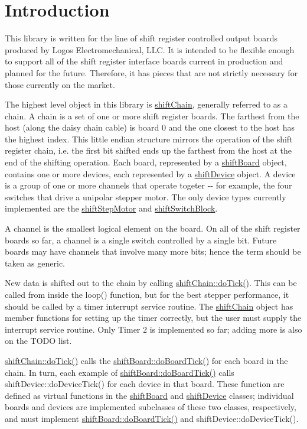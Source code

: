 \hypertarget{main_intro}{}\section{Introduction}\label{main_intro}
This library is written for the line of shift register controlled output boards produced by Logos Electromechanical, LLC. It is intended to be flexible enough to support all of the shift register interface boards current in production and planned for the future. Therefore, it has pieces that are not strictly necessary for those currently on the market.

The highest level object in this library is \hyperlink{classshift_chain}{shiftChain}, generally referred to as a chain. A chain is a set of one or more shift register boards. The farthest from the host (along the daisy chain cable) is board 0 and the one closest to the host has the highest index. This little endian structure mirrors the operation of the shift register chain, i.e. the first bit shifted ends up the farthest from the host at the end of the shifting operation. Each board, represented by a \hyperlink{classshift_board}{shiftBoard} object, contains one or more devices, each represented by a \hyperlink{classshift_device}{shiftDevice} object. A device is a group of one or more channels that operate togeter -\/-\/ for example, the four switches that drive a unipolar stepper motor. The only device types currently implemented are the \hyperlink{classshift_step_motor}{shiftStepMotor} and \hyperlink{classshift_switch_block}{shiftSwitchBlock}.

A channel is the smallest logical element on the board. On all of the shift register boards so far, a channel is a single switch controlled by a single bit. Future boards may have channels that involve many more bits; hence the term should be taken as generic.

New data is shifted out to the chain by calling \hyperlink{classshift_chain_ad6727d72887b7017f68ef6dc7948a7ed}{shiftChain::doTick()}. This can be called from inside the loop() function, but for the best stepper performance, it should be called by a timer interrupt service routine. The \hyperlink{classshift_chain}{shiftChain} object has member functions for setting up the timer correctly, but the user must supply the interrupt service routine. Only Timer 2 is implemented so far; adding more is also on the TODO list.

\hyperlink{classshift_chain_ad6727d72887b7017f68ef6dc7948a7ed}{shiftChain::doTick()} calls the \hyperlink{classshift_board_a5a120f7aeb958c8e8fd0ec87eecc5798}{shiftBoard::doBoardTick()} for each board in the chain. In turn, each example of \hyperlink{classshift_board_a5a120f7aeb958c8e8fd0ec87eecc5798}{shiftBoard::doBoardTick()} calls shiftDevice::doDeviceTick() for each device in that board. These function are defined as virtual functions in the \hyperlink{classshift_board}{shiftBoard} and \hyperlink{classshift_device}{shiftDevice} classes; individual boards and devices are implemented subclasses of these two classes, respectively, and must implement \hyperlink{classshift_board_a5a120f7aeb958c8e8fd0ec87eecc5798}{shiftBoard::doBoardTick()} and shiftDevice::doDeviceTick().

